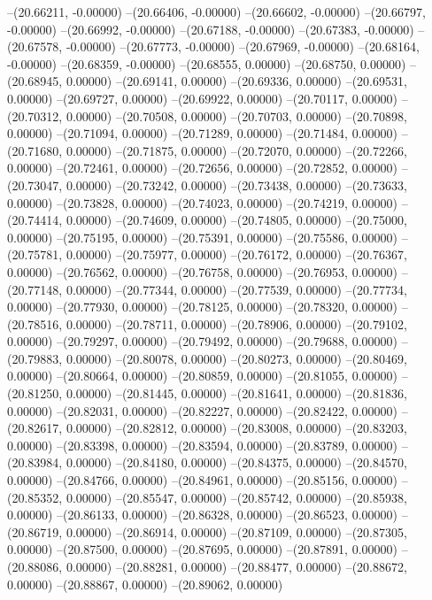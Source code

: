 --(20.66211, -0.00000)
--(20.66406, -0.00000)
--(20.66602, -0.00000)
--(20.66797, -0.00000)
--(20.66992, -0.00000)
--(20.67188, -0.00000)
--(20.67383, -0.00000)
--(20.67578, -0.00000)
--(20.67773, -0.00000)
--(20.67969, -0.00000)
--(20.68164, -0.00000)
--(20.68359, -0.00000)
--(20.68555, 0.00000)
--(20.68750, 0.00000)
--(20.68945, 0.00000)
--(20.69141, 0.00000)
--(20.69336, 0.00000)
--(20.69531, 0.00000)
--(20.69727, 0.00000)
--(20.69922, 0.00000)
--(20.70117, 0.00000)
--(20.70312, 0.00000)
--(20.70508, 0.00000)
--(20.70703, 0.00000)
--(20.70898, 0.00000)
--(20.71094, 0.00000)
--(20.71289, 0.00000)
--(20.71484, 0.00000)
--(20.71680, 0.00000)
--(20.71875, 0.00000)
--(20.72070, 0.00000)
--(20.72266, 0.00000)
--(20.72461, 0.00000)
--(20.72656, 0.00000)
--(20.72852, 0.00000)
--(20.73047, 0.00000)
--(20.73242, 0.00000)
--(20.73438, 0.00000)
--(20.73633, 0.00000)
--(20.73828, 0.00000)
--(20.74023, 0.00000)
--(20.74219, 0.00000)
--(20.74414, 0.00000)
--(20.74609, 0.00000)
--(20.74805, 0.00000)
--(20.75000, 0.00000)
--(20.75195, 0.00000)
--(20.75391, 0.00000)
--(20.75586, 0.00000)
--(20.75781, 0.00000)
--(20.75977, 0.00000)
--(20.76172, 0.00000)
--(20.76367, 0.00000)
--(20.76562, 0.00000)
--(20.76758, 0.00000)
--(20.76953, 0.00000)
--(20.77148, 0.00000)
--(20.77344, 0.00000)
--(20.77539, 0.00000)
--(20.77734, 0.00000)
--(20.77930, 0.00000)
--(20.78125, 0.00000)
--(20.78320, 0.00000)
--(20.78516, 0.00000)
--(20.78711, 0.00000)
--(20.78906, 0.00000)
--(20.79102, 0.00000)
--(20.79297, 0.00000)
--(20.79492, 0.00000)
--(20.79688, 0.00000)
--(20.79883, 0.00000)
--(20.80078, 0.00000)
--(20.80273, 0.00000)
--(20.80469, 0.00000)
--(20.80664, 0.00000)
--(20.80859, 0.00000)
--(20.81055, 0.00000)
--(20.81250, 0.00000)
--(20.81445, 0.00000)
--(20.81641, 0.00000)
--(20.81836, 0.00000)
--(20.82031, 0.00000)
--(20.82227, 0.00000)
--(20.82422, 0.00000)
--(20.82617, 0.00000)
--(20.82812, 0.00000)
--(20.83008, 0.00000)
--(20.83203, 0.00000)
--(20.83398, 0.00000)
--(20.83594, 0.00000)
--(20.83789, 0.00000)
--(20.83984, 0.00000)
--(20.84180, 0.00000)
--(20.84375, 0.00000)
--(20.84570, 0.00000)
--(20.84766, 0.00000)
--(20.84961, 0.00000)
--(20.85156, 0.00000)
--(20.85352, 0.00000)
--(20.85547, 0.00000)
--(20.85742, 0.00000)
--(20.85938, 0.00000)
--(20.86133, 0.00000)
--(20.86328, 0.00000)
--(20.86523, 0.00000)
--(20.86719, 0.00000)
--(20.86914, 0.00000)
--(20.87109, 0.00000)
--(20.87305, 0.00000)
--(20.87500, 0.00000)
--(20.87695, 0.00000)
--(20.87891, 0.00000)
--(20.88086, 0.00000)
--(20.88281, 0.00000)
--(20.88477, 0.00000)
--(20.88672, 0.00000)
--(20.88867, 0.00000)
--(20.89062, 0.00000)
